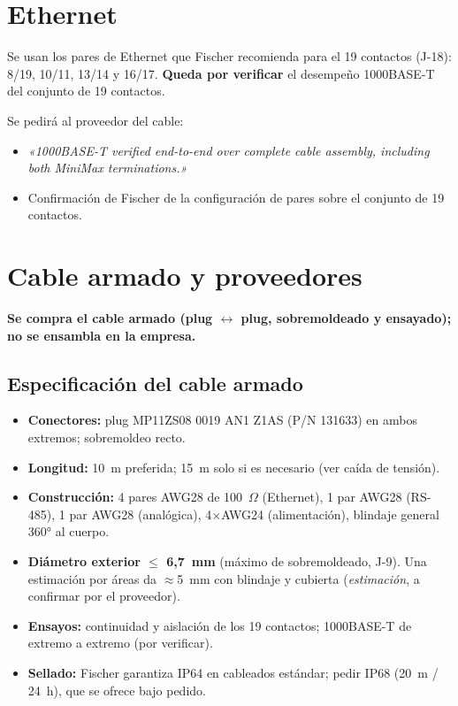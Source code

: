 \documentclass[11pt,a4paper]{article}
\begin{document}
\section{Ethernet}
Se usan los pares de Ethernet que Fischer recomienda para el 19 contactos (J-18): 8/19, 10/11, 13/14 y 16/17. \textbf{Queda por verificar} el desempeño 1000BASE-T del conjunto de 19 contactos.

Se pedirá al proveedor del cable:
\begin{itemize}
  \item \emph{«1000BASE-T verified end-to-end over complete cable assembly, including both MiniMax terminations.»}
  \item Confirmación de Fischer de la configuración de pares sobre el conjunto de 19 contactos.
\end{itemize}

\section{Cable armado y proveedores}
\textbf{Se compra el cable armado (plug $\leftrightarrow$ plug, sobremoldeado y ensayado); no se ensambla en la empresa.}

\subsection{Especificación del cable armado}
\begin{itemize}
  \item \textbf{Conectores:} plug MP11ZS08 0019 AN1 Z1AS (P/N 131633) en ambos extremos; sobremoldeo recto.
  \item \textbf{Longitud:} 10~m preferida; 15~m solo si es necesario (ver caída de tensión).
  \item \textbf{Construcción:} 4 pares AWG28 de 100~$\Omega$ (Ethernet), 1 par AWG28 (RS-485), 1 par AWG28 (analógica), 4$\times$AWG24 (alimentación), blindaje general 360° al cuerpo.
  \item \textbf{Diámetro exterior $\le$ 6,7~mm} (máximo de sobremoldeado, J-9). Una estimación por áreas da $\approx$5~mm con blindaje y cubierta (\emph{estimación}, a confirmar por el proveedor).
  \item \textbf{Ensayos:} continuidad y aislación de los 19 contactos; 1000BASE-T de extremo a extremo (por verificar).
  \item \textbf{Sellado:} Fischer garantiza IP64 en cableados estándar; pedir IP68 (20~m / 24~h), que se ofrece bajo pedido.
\end{itemize}
\end{document}
